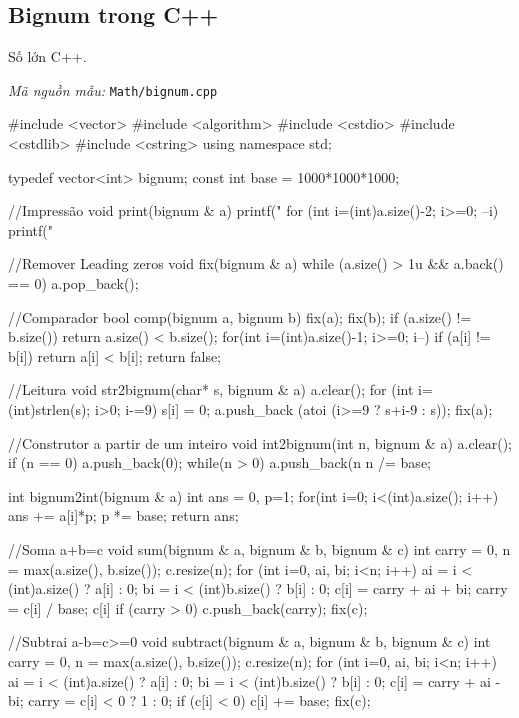 \documentclass[11pt]{article}
\newcommand{\codepath}[1]{\par\noindent\textit{Mã nguồn mẫu:} \texttt{#1}\par}
\begin{document}
\subsection{Bignum trong C++}

Số lớn C++.

\codepath{Math/bignum.cpp}

\begingroup\scriptsize
\begin{vncode}
#include <vector>
#include <algorithm>
#include <cstdio>
#include <cstdlib>
#include <cstring>
using namespace std;

typedef vector<int> bignum;
const int base = 1000*1000*1000;

//Impressão
void print(bignum & a) {
	printf("%
	for (int i=(int)a.size()-2; i>=0; --i) {
		printf("%
	}
}

//Remover Leading zeros
void fix(bignum & a) {
	while (a.size() > 1u && a.back() == 0) {
		a.pop_back();
	}
}

//Comparador
bool comp(bignum a, bignum b) {
	fix(a); fix(b);
	if (a.size() != b.size()) return a.size() < b.size();
	for(int i=(int)a.size()-1; i>=0; i--) {
		if (a[i] != b[i]) return a[i] < b[i];
	}
	return false;
}

//Leitura
void str2bignum(char* s, bignum & a) {
	a.clear();
	for (int i=(int)strlen(s); i>0; i-=9) {
		s[i] = 0;
		a.push_back (atoi (i>=9 ? s+i-9 : s));
	}
	fix(a);
}

//Construtor a partir de um inteiro
void int2bignum(int n, bignum & a) {
	a.clear();
	if (n == 0) a.push_back(0);
	while(n > 0) {
		a.push_back(n%
		n /= base;
	}
}

int bignum2int(bignum & a) {
	int ans = 0, p=1;
	for(int i=0; i<(int)a.size(); i++) {
		ans += a[i]*p;
		p *= base;
	}
	return ans;
}

//Soma a+b=c
void sum(bignum & a, bignum & b, bignum & c) {
	int carry = 0, n = max(a.size(), b.size());
	c.resize(n);
	for (int i=0, ai, bi; i<n; i++) {
		ai = i < (int)a.size() ? a[i] : 0;
		bi = i < (int)b.size() ? b[i] : 0;
		c[i] = carry + ai + bi;
		carry = c[i] / base;
		c[i] %
	}
	if (carry > 0) c.push_back(carry);
	fix(c);
}

//Subtrai a-b=c>=0
void subtract(bignum & a, bignum & b, bignum & c) {
	int carry = 0, n = max(a.size(), b.size());
	c.resize(n);
	for (int i=0, ai, bi; i<n; i++) {
		ai = i < (int)a.size() ? a[i] : 0;
		bi = i < (int)b.size() ? b[i] : 0;
		c[i] = carry + ai - bi;
		carry = c[i] < 0 ? 1 : 0;
		if (c[i] < 0) c[i] += base;
	}
	fix(c);
}


\end{vncode}
\end{document}
